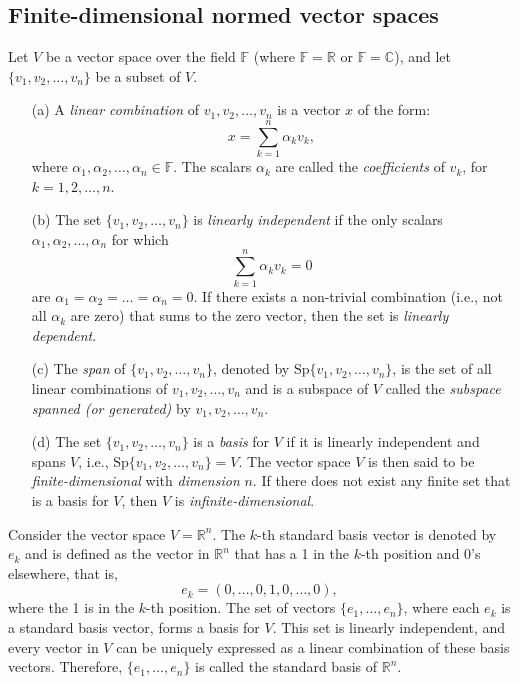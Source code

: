 \subsection{Finite-dimensional normed vector spaces}
\begin{definition}
Let \( V \) be a vector space over the field \( \mathbb{F} \) (where \( \mathbb{F} = \mathbb{R} \) or \( \mathbb{F} = \mathbb{C} \)), and let \( \{v_1, v_2, \dots, v_n\} \) be a subset of \( V \).
    \begin{enumerate}
        \item[(a)] A \emph{linear combination} of \( v_1, v_2, \dots, v_n \) is a vector \( x \) of the form:
        \[
        x = \sum_{k=1}^{n} \alpha_k v_k,
        \]
        where \( \alpha_1, \alpha_2, \dots, \alpha_n \in \mathbb{F} \). The scalars \( \alpha_k \) are called the \emph{coefficients} of \( v_k \), for \( k = 1, 2, \dots, n \).

        \item[(b)] The set \( \{v_1, v_2, \dots, v_n\} \) is \emph{linearly independent} if the only scalars \( \alpha_1, \alpha_2, \dots, \alpha_n \) for which
        \[
        \sum_{k=1}^{n} \alpha_k v_k = 0
        \]
        are \( \alpha_1 = \alpha_2 = \dots = \alpha_n = 0 \). If there exists a non-trivial combination (i.e., not all \( \alpha_k \) are zero) that sums to the zero vector, then the set is \emph{linearly dependent}.

        \item[(c)] The \emph{span} of \( \{v_1, v_2, \dots, v_n\} \), denoted by \( \text{Sp}\{v_1, v_2, \dots, v_n\} \), is the set of all linear combinations of \( v_1, v_2, \dots, v_n \) and is a subspace of \( V \) called the \emph{subspace spanned (or generated)} by \( v_1, v_2, \dots, v_n \).

        \item[(d)] The set \( \{v_1, v_2, \dots, v_n\} \) is a \emph{basis} for \( V \) if it is linearly independent and spans \( V \), i.e., \( \text{Sp}\{v_1, v_2, \dots, v_n\} = V \). The vector space \( V \) is then said to be \emph{finite-dimensional} with \emph{dimension} \( n \). If there does not exist any finite set that is a basis for \( V \), then \( V \) is \emph{infinite-dimensional}.
    \end{enumerate}
\end{definition}

\begin{example}
Consider the vector space \( V = \mathbb{R}^n \). The \( k \)-th standard basis vector is denoted by \( e_k \) and is defined as the vector in \( \mathbb{R}^n \) that has a 1 in the \( k \)-th position and 0's elsewhere, that is,
\[ e_k = (0, \ldots, 0, 1, 0, \ldots, 0), \]
where the 1 is in the \( k \)-th position. The set of vectors \( \{e_1, \ldots, e_n\} \), where each \( e_k \) is a standard basis vector, forms a basis for \( V \). This set is linearly independent, and every vector in \( V \) can be uniquely expressed as a linear combination of these basis vectors. Therefore, \( \{e_1, \ldots, e_n\} \) is called the standard basis of \( \mathbb{R}^n \).
\end{example}

